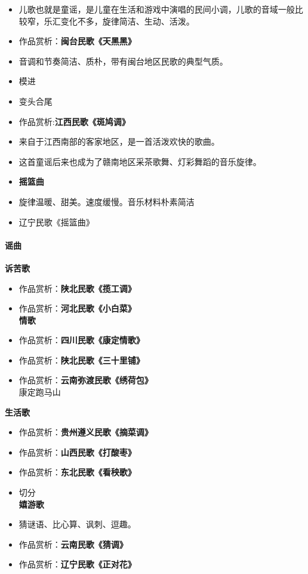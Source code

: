 \documentclass[
]{article}
\providecommand{\tightlist}{%
  \setlength{\itemsep}{0pt}\setlength{\parskip}{0pt}}
\begin{document}
\begin{itemize}
\item
  儿歌也就是童谣，是儿童在生活和游戏中演唱的民间小调，儿歌的音域一般比较窄，乐汇变化不多，旋律简洁、生动、活泼。
\item
  作品赏析：\textbf{闽台民歌《天黑黑》}
\item
  音调和节奏简洁、质朴，带有闽台地区民歌的典型气质。
\item
  模进
\item
  变头合尾
\item
  作品赏析:\textbf{江西民歌《斑鸠调》}
\item
  来自于江西南部的客家地区，是一首活泼欢快的歌曲。
\item
  这首童谣后来也成为了赣南地区采茶歌舞、灯彩舞蹈的音乐旋律。
\item
  \textbf{摇篮曲}
\item
  旋律温暖、甜美。速度缓慢。音乐材料朴素简洁
\item
  辽宁民歌《摇篮曲》
\end{itemize}

\paragraph{谣曲}\label{ux8c23ux66f2}

\textbf{诉苦歌}

\begin{itemize}
\tightlist
\item
  作品赏析：\textbf{陕北民歌《揽工调》}
\item
  作品赏析：\textbf{河北民歌《小白菜》}\\
  \textbf{情歌}
\item
  作品赏析：\textbf{四川民歌《康定情歌》}
\item
  作品赏析：\textbf{陕北民歌《三十里铺》}
\item
  作品赏析：\textbf{云南弥渡民歌《绣荷包》}\\
  康定跑马山
\end{itemize}

\textbf{生活歌}

\begin{itemize}
\tightlist
\item
  作品赏析：\textbf{贵州遵义民歌《摘菜调》}
\item
  作品赏析：\textbf{山西民歌《打酸枣》}
\item
  作品赏析：\textbf{东北民歌《看秧歌》}
\item
  切分\\
  \textbf{嬉游歌}
\item
  猜谜语、比心算、讽刺、逗趣。
\item
  作品赏析：\textbf{云南民歌《猜调》}
\item
  作品赏析：\textbf{辽宁民歌《正对花》}
\end{itemize}
\end{document}
